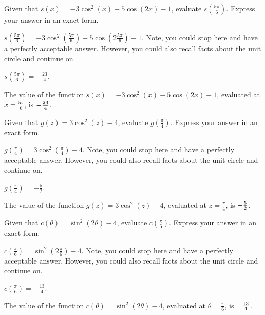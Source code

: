 \begin{shuffle}
\begin{exercise}
Given that $s(x)=-3 \cos ^2(x)-5 \cos (2 x)-1$, evaluate $s\left(\frac{5 \pi }{6}\right)$. Express your answer in an exact form.
\begin{solution}
\begin{hint}
$s\left(\frac{5 \pi }{6}\right)=-3 \cos ^2\left(\frac{5 \pi }{6}\right)-5 \cos \left(2 \frac{5 \pi }{6}\right)-1$. Note, you could stop here and have a perfectly acceptable answer. However, you could also recall facts about the unit circle and continue on. 
\end{hint}
\begin{hint}
$s\left(\frac{5 \pi }{6}\right)=-\frac{23}{4}$.
\end{hint}
The value of the function $s(x)=-3 \cos ^2(x)-5 \cos (2 x)-1$, evaluated at $x=\frac{5 \pi }{6}$, is ${-\frac{23}{4}}$.
\end{solution}
\end{exercise}

\begin{exercise}
Given that $g(z)=3 \cos ^2(z)-4$, evaluate $g\left(\frac{\pi }{4}\right)$. Express your answer in an exact form.
\begin{solution}
\begin{hint}
$g\left(\frac{\pi }{4}\right)=3 \cos ^2\left(\frac{\pi }{4}\right)-4$. Note, you could stop here and have a perfectly acceptable answer. However, you could also recall facts about the unit circle and continue on. 
\end{hint}
\begin{hint}
$g\left(\frac{\pi }{4}\right)=-\frac{5}{2}$.
\end{hint}
The value of the function $g(z)=3 \cos ^2(z)-4$, evaluated at $z=\frac{\pi }{4}$, is ${-\frac{5}{2}}$.
\end{solution}
\end{exercise}

\begin{exercise}
Given that $c(\theta)=\sin ^2(2 \theta )-4$, evaluate $c\left(\frac{\pi }{6}\right)$. Express your answer in an exact form.
\begin{solution}
\begin{hint}
$c\left(\frac{\pi }{6}\right)=\sin ^2\left(2 \frac{\pi }{6}\right)-4$. Note, you could stop here and have a perfectly acceptable answer. However, you could also recall facts about the unit circle and continue on. 
\end{hint}
\begin{hint}
$c\left(\frac{\pi }{6}\right)=-\frac{13}{4}$.
\end{hint}
The value of the function $c(\theta)=\sin ^2(2 \theta )-4$, evaluated at $\theta=\frac{\pi }{6}$, is ${-\frac{13}{4}}$.
\end{solution}
\end{exercise}


\end{shuffle}
